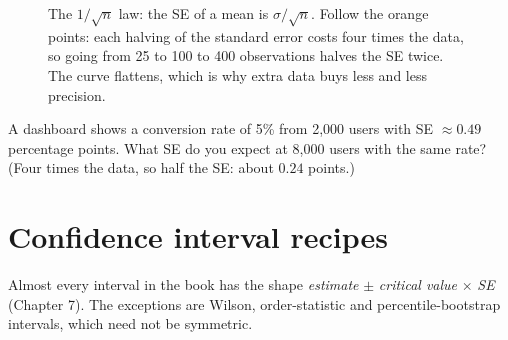 \begin{figure}[H]
\centering
{}
\caption{The $1/\sqrt n$ law: the SE of a mean is $\sigma/\sqrt n$. Follow the orange points: each halving of the standard error costs four times the data, so going from 25 to 100 to 400 observations halves the SE twice. The curve flattens, which is why extra data buys less and less precision.}
\label{fig:appendix-formulas-sqrtn}
\end{figure}

\begin{recoverybox}
A dashboard shows a conversion rate of 5\% from 2{,}000 users with SE $\approx 0.49$ percentage points. What SE do you expect at 8{,}000 users with the same rate? (Four times the data, so half the SE: about $0.24$ points.)
\end{recoverybox}

\section{Confidence interval recipes}

Almost every interval in the book has the shape \emph{estimate} $\pm$ \emph{critical value} $\times$ \emph{SE} (Chapter 7). The exceptions are Wilson, order-statistic and percentile-bootstrap intervals, which need not be symmetric.

